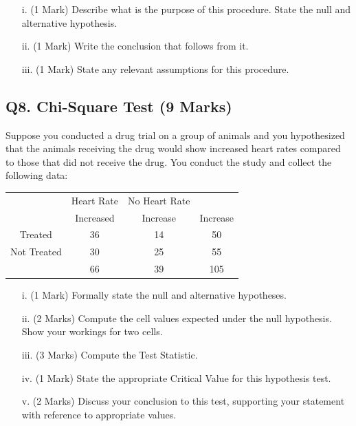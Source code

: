 \documentclass[a4paper,12pt]{article}
\begin{document}
\begin{itemize}
	\item[i.] (1 Mark) Describe what is the purpose of this procedure. State the null and alternative hypothesis.
	\item[ii.] (1 Mark) Write the conclusion that follows from it.
	\item[iii.] (1 Mark) State any relevant assumptions for this procedure.
\end{itemize}

\subsection*{Q8. Chi-Square Test (9 Marks)} %
Suppose you conducted a drug trial on a group of animals and you hypothesized that the animals receiving the drug would show increased heart rates compared to those that did not receive the drug. You conduct the study and collect the following data:
{
	\large
\begin{center}
\begin{tabular}{|c|c|c|c|}
	\hline  & Heart Rate & No Heart Rate  &  \\  
	  & Increased & Increase & Increase \\ 
	\hline Treated  & 36 & 14 & 50 \\ 
	\hline Not Treated & 30 & 25 & 55 \\ 
	\hline  & 66 & 39 & 105 \\ 
	\hline 
\end{tabular} 
\end{center}
}
\begin{itemize}
	\item[i.](1 Mark) Formally state the null and alternative hypotheses.
	\item[ii.] (2 Marks) Compute the cell values expected under the null hypothesis. Show your workings for two cells.
	\item[iii.](3 Marks) Compute the Test Statistic.
	\item[iv.](1 Mark) State the appropriate Critical Value for this hypothesis test.
	\item[v.](2 Marks) Discuss your conclusion to this test, supporting your statement with reference to appropriate values.
\end{itemize}

%
\end{document}
